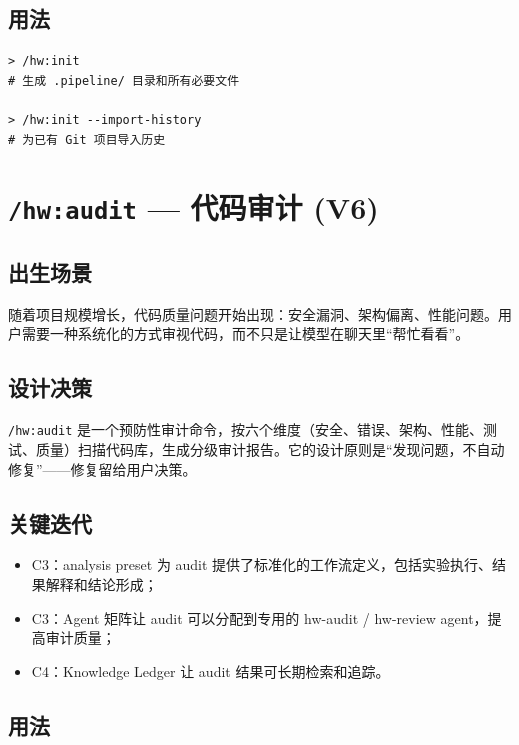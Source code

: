 \documentclass[
  outputdir=build,
  chapterstyle=cn,
  colorscheme=Simple,
  fontset=tech,
  code=false
]{Hypo-Note}
\begin{document}
\subsection{用法}

\begin{lstlisting}[caption=初始化项目]
> /hw:init
# 生成 .pipeline/ 目录和所有必要文件

> /hw:init --import-history
# 为已有 Git 项目导入历史
\end{lstlisting}

\section{\texttt{/hw:audit} — 代码审计 (V6)}

\subsection{出生场景}

随着项目规模增长，代码质量问题开始出现：安全漏洞、架构偏离、性能问题。用户需要一种系统化的方式审视代码，而不只是让模型在聊天里“帮忙看看”。

\subsection{设计决策}

\texttt{/hw:audit} 是一个预防性审计命令，按六个维度（安全、错误、架构、性能、测试、质量）扫描代码库，生成分级审计报告。它的设计原则是“发现问题，不自动修复”——修复留给用户决策。

\subsection{关键迭代}

\begin{itemize}[leftmargin=2em]
  \item C3：analysis preset 为 audit 提供了标准化的工作流定义，包括实验执行、结果解释和结论形成；
  \item C3：Agent 矩阵让 audit 可以分配到专用的 hw-audit / hw-review agent，提高审计质量；
  \item C4：Knowledge Ledger 让 audit 结果可长期检索和追踪。
\end{itemize}

\subsection{用法}
\end{document}
